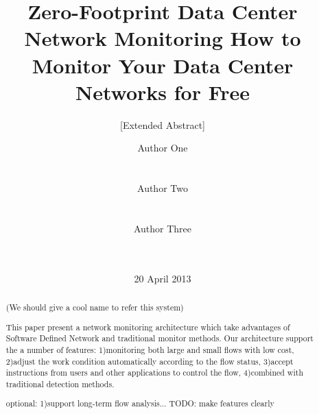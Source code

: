 \documentclass{acm_proc_article-sp}
\begin{document}
\title{Zero-Footprint Data Center Network Monitoring How to Monitor Your Data Center Networks for Free}
\subtitle{[Extended Abstract]}

\author{
\alignauthor
Author One\\
       \\
       \\
\alignauthor
Author Two\\
       \\
       \\
\alignauthor
Author Three\\
       \\
       \\
}


\date{20 April 2013}

\maketitle

\balance

\begin{abstract}
(We should give a cool name to refer this system)

This paper present a network monitoring architecture which take advantages of Software Defined Network and traditional monitor methods. Our architecture support the a number of features: 1)monitoring both large and small flows with low cost, 2)adjust the work condition automatically according to the flow status, 3)accept instructions from users and other applications to control the flow, 4)combined with traditional detection methods.

optional: 1)support long-term flow analysis...
TODO: make features clearly
\end{abstract}

\end{document}
